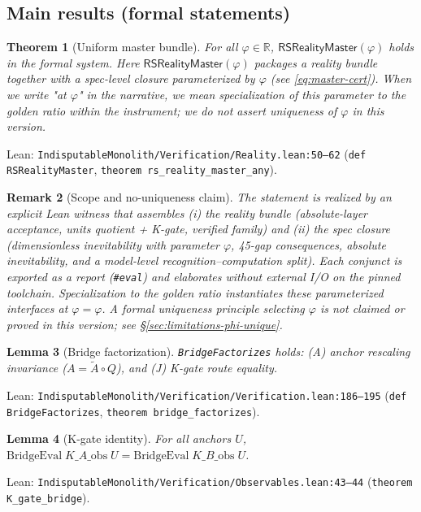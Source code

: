 \documentclass[11pt,a4paper,twoside]{article}
\numberwithin{equation}{section}
\newcommand{\phigr}{\varphi} %
\theoremstyle{customthm}
\newtheorem{theorem}{Theorem}[section]
\newtheorem{lemma}[theorem]{Lemma}
\theoremstyle{customdef}
\theoremstyle{customrem}
\newtheorem{remark}[theorem]{Remark}
\begin{document}
\subsection{Main results (formal statements)}

\begin{theorem}[Uniform master bundle]\label{thm:master}
For all $\varphi\in\mathbb{R}$, \(\mathsf{RSRealityMaster}(\varphi)\) holds in the formal system. Here $\mathsf{RSRealityMaster}(\varphi)$ packages a reality bundle together with a spec-level closure parameterized by $\varphi$ (see \eqref{eq:master-cert}). When we write "at $\varphi$" in the narrative, we mean specialization of this parameter to the golden ratio within the instrument; we do not assert uniqueness of $\varphi$ in this version.
\end{theorem}
\noindent Lean: \texttt{IndisputableMonolith/Verification/Reality.lean:50--62} (\texttt{def RSRealityMaster}, \texttt{theorem rs\_reality\_master\_any}).

\begin{remark}[Scope and no-uniqueness claim]
The statement is realized by an explicit Lean witness that assembles (i) the reality bundle (absolute-layer acceptance, units quotient + K-gate, verified family) and (ii) the spec closure (dimensionless inevitability with parameter $\varphi$, 45-gap consequences, absolute inevitability, and a model-level recognition–computation split). Each conjunct is exported as a report (\texttt{\#eval}) and elaborates without external I/O on the pinned toolchain. Specialization to the golden ratio instantiates these parameterized interfaces at $\varphi=\phigr$. A formal uniqueness principle selecting $\phigr$ is not claimed or proved in this version; see \S\ref{sec:limitations-phi-unique}.
\end{remark}

\begin{lemma}[Bridge factorization]\label{lem:factorizes}
\texttt{BridgeFactorizes} holds: (A) anchor rescaling invariance (\(A=\tilde A\circ Q\)), and (J) K-gate route equality.
\end{lemma}
\noindent Lean: \texttt{IndisputableMonolith/Verification/Verification.lean:186--195} (\texttt{def BridgeFactorizes}, \texttt{theorem bridge\_factorizes}).

\begin{lemma}[K-gate identity]\label{lem:kgate}
For all anchors $U$, \(\mathrm{BridgeEval}\;K\_A\_\mathrm{obs}\;U = \mathrm{BridgeEval}\;K\_B\_\mathrm{obs}\;U\).
\end{lemma}
\noindent Lean: \texttt{IndisputableMonolith/Verification/Observables.lean:43--44} (\texttt{theorem K\_gate\_bridge}).
\end{document}

